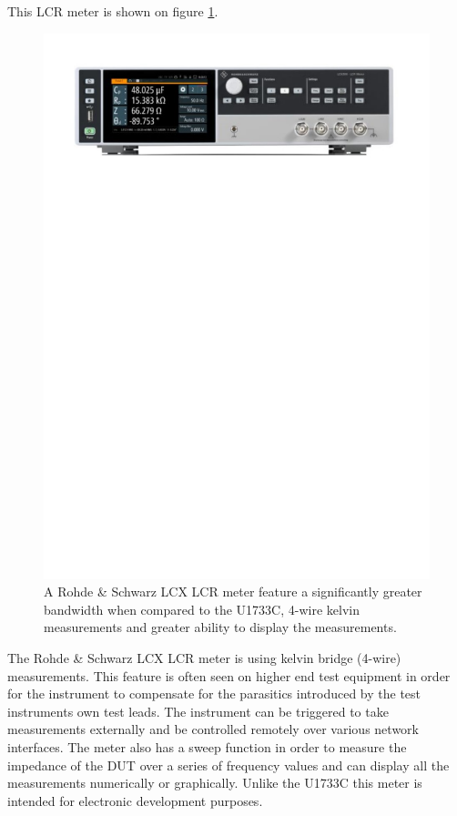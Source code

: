 This LCR meter is shown on figure \ref{fig:2_2_RSLCX}. 
\begin{figure}[H]
    \centering
    \includegraphics[clip, trim=0 630 0 50, width=1\textwidth]{Sections/2_ProblemAnalysis/FIgures/RSLCXLCR.pdf}
    \caption{A Rohde \& Schwarz LCX LCR meter feature a significantly greater bandwidth when compared to the U1733C, 4-wire kelvin measurements and greater ability to display the measurements.\cite{RSLCXLCRMeters}}
    \label{fig:2_2_RSLCX}
\end{figure}

The Rohde \& Schwarz LCX LCR meter is using kelvin bridge (4-wire) measurements.  This feature is often seen on higher end test equipment in order for the instrument to compensate for the parasitics introduced by the test instruments own test leads. The instrument can be triggered to take measurements externally and be controlled remotely over various network interfaces. The meter also has a sweep function in order to measure the impedance of the DUT over a series of frequency values and can display all the measurements numerically or graphically. Unlike the U1733C this meter is intended for electronic development purposes.

